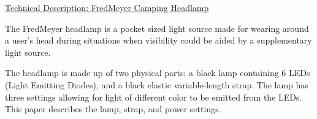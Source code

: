\documentclass[12pt]{article}
\def\title{Technical Description: FredMeyer Camping Headlamp}
\begin{document}
\begin{center}
\underline{
\large{\title}
}
\end{center}

\singlespacing
The FredMeyer headlamp is a pocket sized light source made for wearing around a user's head during
situations when visibility could be aided by a supplementary light source.

The headlamp is made up of two physical parts: a black lamp containing 6 LEDs (Light Emitting
Diodes), and a black elastic variable-length strap. The lamp has three settings allowing for light
of different color to be emitted from the LEDs. This paper describes the lamp, strap, and power
settings.
\end{document}

